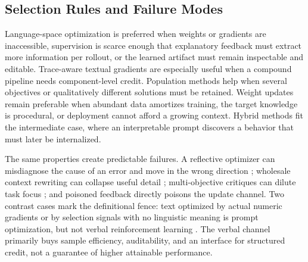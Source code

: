 \subsection{Selection Rules and Failure Modes}
\label{subsec:optimizers-tradeoffs}

Language-space optimization is preferred when weights or gradients are inaccessible, supervision is scarce enough that explanatory feedback must extract more information per rollout, or the learned artifact must remain inspectable and editable. Trace-aware textual gradients are especially useful when a compound pipeline needs component-level credit. Population methods help when several objectives or qualitatively different solutions must be retained. Weight updates remain preferable when abundant data amortizes training, the target knowledge is procedural, or deployment cannot afford a growing context. Hybrid methods fit the intermediate case, where an interpretable prompt discovers a behavior that must later be internalized.

The same properties create predictable failures. A reflective optimizer can misdiagnose the cause of an error and move in the wrong direction \citep{ma2024are}; wholesale context rewriting can collapse useful detail \citep{zhang2025agentic}; multi-objective critiques can dilute task focus \citep{darshan2026when}; and poisoned feedback directly poisons the update channel. Two contrast cases mark the definitional fence: text optimized by actual numeric gradients or by selection signals with no linguistic meaning is prompt optimization, but not verbal reinforcement learning \citep{das2024greater,wang2025evolving}. The verbal channel primarily buys sample efficiency, auditability, and an interface for structured credit, not a guarantee of higher attainable performance.
